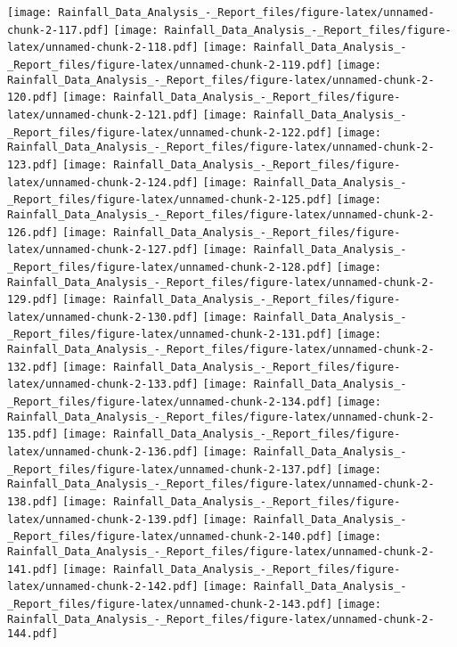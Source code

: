 \documentclass[
]{article}
\begin{document}
\texttt{[image: Rainfall\_Data\_Analysis\_-\_Report\_files/figure-latex/unnamed-chunk-2-117.pdf]}
\texttt{[image: Rainfall\_Data\_Analysis\_-\_Report\_files/figure-latex/unnamed-chunk-2-118.pdf]}
\texttt{[image: Rainfall\_Data\_Analysis\_-\_Report\_files/figure-latex/unnamed-chunk-2-119.pdf]}
\texttt{[image: Rainfall\_Data\_Analysis\_-\_Report\_files/figure-latex/unnamed-chunk-2-120.pdf]}
\texttt{[image: Rainfall\_Data\_Analysis\_-\_Report\_files/figure-latex/unnamed-chunk-2-121.pdf]}
\texttt{[image: Rainfall\_Data\_Analysis\_-\_Report\_files/figure-latex/unnamed-chunk-2-122.pdf]}
\texttt{[image: Rainfall\_Data\_Analysis\_-\_Report\_files/figure-latex/unnamed-chunk-2-123.pdf]}
\texttt{[image: Rainfall\_Data\_Analysis\_-\_Report\_files/figure-latex/unnamed-chunk-2-124.pdf]}
\texttt{[image: Rainfall\_Data\_Analysis\_-\_Report\_files/figure-latex/unnamed-chunk-2-125.pdf]}
\texttt{[image: Rainfall\_Data\_Analysis\_-\_Report\_files/figure-latex/unnamed-chunk-2-126.pdf]}
\texttt{[image: Rainfall\_Data\_Analysis\_-\_Report\_files/figure-latex/unnamed-chunk-2-127.pdf]}
\texttt{[image: Rainfall\_Data\_Analysis\_-\_Report\_files/figure-latex/unnamed-chunk-2-128.pdf]}
\texttt{[image: Rainfall\_Data\_Analysis\_-\_Report\_files/figure-latex/unnamed-chunk-2-129.pdf]}
\texttt{[image: Rainfall\_Data\_Analysis\_-\_Report\_files/figure-latex/unnamed-chunk-2-130.pdf]}
\texttt{[image: Rainfall\_Data\_Analysis\_-\_Report\_files/figure-latex/unnamed-chunk-2-131.pdf]}
\texttt{[image: Rainfall\_Data\_Analysis\_-\_Report\_files/figure-latex/unnamed-chunk-2-132.pdf]}
\texttt{[image: Rainfall\_Data\_Analysis\_-\_Report\_files/figure-latex/unnamed-chunk-2-133.pdf]}
\texttt{[image: Rainfall\_Data\_Analysis\_-\_Report\_files/figure-latex/unnamed-chunk-2-134.pdf]}
\texttt{[image: Rainfall\_Data\_Analysis\_-\_Report\_files/figure-latex/unnamed-chunk-2-135.pdf]}
\texttt{[image: Rainfall\_Data\_Analysis\_-\_Report\_files/figure-latex/unnamed-chunk-2-136.pdf]}
\texttt{[image: Rainfall\_Data\_Analysis\_-\_Report\_files/figure-latex/unnamed-chunk-2-137.pdf]}
\texttt{[image: Rainfall\_Data\_Analysis\_-\_Report\_files/figure-latex/unnamed-chunk-2-138.pdf]}
\texttt{[image: Rainfall\_Data\_Analysis\_-\_Report\_files/figure-latex/unnamed-chunk-2-139.pdf]}
\texttt{[image: Rainfall\_Data\_Analysis\_-\_Report\_files/figure-latex/unnamed-chunk-2-140.pdf]}
\texttt{[image: Rainfall\_Data\_Analysis\_-\_Report\_files/figure-latex/unnamed-chunk-2-141.pdf]}
\texttt{[image: Rainfall\_Data\_Analysis\_-\_Report\_files/figure-latex/unnamed-chunk-2-142.pdf]}
\texttt{[image: Rainfall\_Data\_Analysis\_-\_Report\_files/figure-latex/unnamed-chunk-2-143.pdf]}
\texttt{[image: Rainfall\_Data\_Analysis\_-\_Report\_files/figure-latex/unnamed-chunk-2-144.pdf]}
\end{document}
